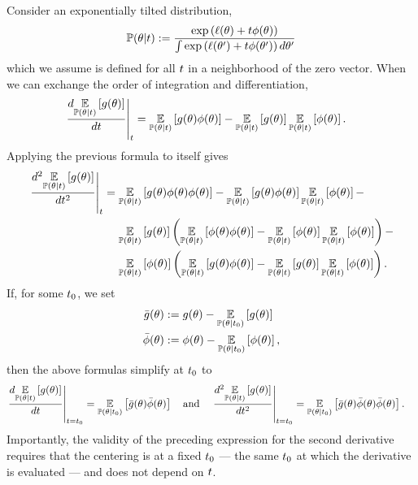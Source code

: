 \def\et#1{\expect{\p(\theta \vert \t)}{#1}}
\def\etzero#1{\expect{\p(\theta \vert \t_0)}{#1}}
\def\phibar{\bar{\phi}}

Consider an exponentially tilted distribution,
%
\begin{align*}
%
\p(\theta \vert \t) :=
    \frac{\exp\left(
        \ell(\theta) + \t \phi(\theta)
        \right)}
        {\int \exp\left(
            \ell(\theta') + \t \phi(\theta')
            \right) d\theta'}
%
\end{align*}
%
which we assume is defined for all $t$ in a neighborhood of the zero vector.
When we can exchange the order of integration and differentiation,
%
\begin{align*}
%
\fracat{d \et{\g(\theta)}}{d \t}{\t}
={}&
\et{\g(\theta) \phi(\theta)} - \et{\g(\theta)} \et{\phi(\theta)}.
%
\end{align*}
%
Applying the previous formula to itself gives
%
\begin{align*}
%
\fracat{d^2 \expect{\p(\theta \vert \t)}{\g(\theta)}}{d \t^2}{\t}
={}&
\et{\g(\theta) \phi(\theta) \phi(\theta)} -
\et{\g(\theta) \phi(\theta)} \et{\phi(\theta)} -
\\&
\et{\g(\theta)} \left(
    \et{\phi(\theta) \phi(\theta)}  - \et{\phi(\theta)}\et{\phi(\theta)}
\right) -
\\&
\et{\phi(\theta)} \left(
    \et{\g(\theta) \phi(\theta)} - \et{\g(\theta)} \et{\phi(\theta)}
\right).
%
\end{align*}
%
If, for some $t_0$, we set
%
\begin{align*}
%
\gbar(\theta) :={}& \g(\theta) - \expect{\p(\theta \vert \t_0)}{\g(\theta)} \\
\phibar(\theta) :={}& \phi(\theta) -
    \expect{\p(\theta \vert \t_0)}{\phi(\theta)},
%
\end{align*}
%
then the above formulas simplify at $t_0$ to
%
\begin{align*}
%
\fracat{d \et{\g(\theta)}}{d \t}{\t=\t_0} ={}&
    \etzero{\gbar(\theta) \phibar(\theta)} \quad\textrm{and}\quad
\fracat{d^2 \expect{\p(\theta \vert \t)}{\g(\theta)}}{d \t^2}{\t=\t_0} ={}
    \etzero{\gbar(\theta) \phibar(\theta) \phibar(\theta)}.
%
\end{align*}
%
Importantly, the validity of the preceding expression for the second derivative
requires that the centering is at a fixed $t_0$ --- the same $t_0$ at which
the derivative is evaluated --- and does not depend on $t$.

